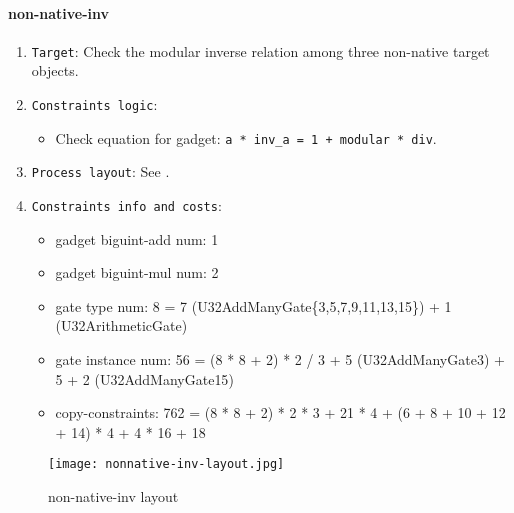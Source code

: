 \paragraph{non-native-inv}

\begin{enumerate}
    \item \verb|Target|: Check the modular inverse relation among three non-native target objects.
    \item \verb|Constraints logic|:
    \begin{itemize}
        \item Check equation for gadget: \verb|a * inv_a = 1 + modular * div|.
    \end{itemize}
    \item \verb|Process layout|: See .
    \item \verb|Constraints info and costs|:
    \begin{itemize}
        \item gadget biguint-add num: 1
        \item gadget biguint-mul num: 2
        \item gate type num: 8 = 7 (U32AddManyGate\{3,5,7,9,11,13,15\}) + 1 (U32ArithmeticGate)
        \item gate instance num: 56 = (8 * 8 + 2) * 2 / 3 + 5 (U32AddManyGate{3}) + 5 + 2 (U32AddManyGate{15})
        \item copy-constraints: 762 = (8 * 8 + 2) * 2 * 3 + 21 * 4 + (6 + 8 + 10 + 12 + 14) * 4 + 4 * 16 + 18
    \end{itemize}
\end{enumerate}

\begin{figure}[!ht]
    \centering
    \texttt{[image: nonnative-inv-layout.jpg]}
    \caption{non-native-inv layout}
    \label{fig:non-native-inv-layout}
\end{figure}